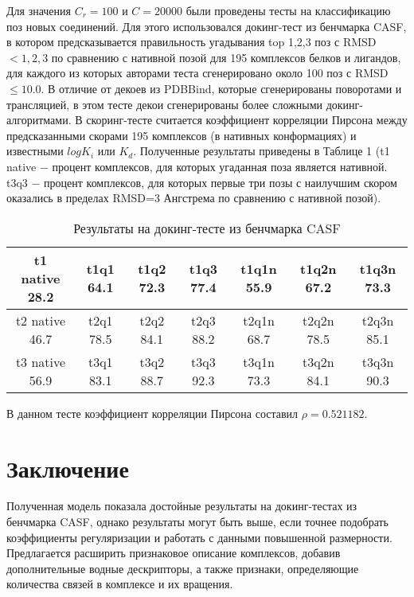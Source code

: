 \documentclass[preprint,12pt,3p]{elsarticle}
\begin{document}
Для значения $C_r = 100$ и $C = 20000$ были проведены тесты на классификацию поз новых соединений. Для этого использовался докинг-тест из бенчмарка CASF, в котором предсказывается правильность угадывания top 1,2,3 поз с RMSD $< 1,2,3$ по сравнению с нативной позой для 195 комплексов белков и лигандов, для каждого из которых авторами теста сгенерировано около 100 поз с RMSD $\leq 10.0$. В отличие от декоев из PDBBind, которые сгенерированы поворотами и трансляцией, в этом тесте декои сгенерированы более сложными докинг-алгоритмами. В скоринг-тесте считается коэффициент корреляции Пирсона между предсказанными скорами 195 комплексов (в нативных конформациях) и известными $log K_i$ или $K_d$. Полученные результаты приведены в Таблице 1 (t1 native $-$ процент комплексов, для которых угаданная поза является нативной. t3q3 $-$ процент комплексов, для которых первые три позы с наилучшим скором оказались в пределах RMSD=3 Ангстрема по сравнению с нативной позой).

\begin{table}[h]
 \begin{tabular}{||c || c || c || c || c || c || c||} 
 \hline
 t1 native 28.2	& t1q1 64.1	& t1q2 72.3	& t1q3 77.4 & t1q1n 55.9 & t1q2n 67.2	& t1q3n 73.3 \\
 \hline
 t2 native 46.7	& t2q1 78.5	& t2q2 84.1	& t2q3 88.2 & t2q1n 68.7 & t2q2n 78.5 & t2q3n 85.1 \\
 \hline
 t3 native 56.9 & t3q1 83.1 & t3q2 88.7	& t3q3 92.3 & t3q1n 73.3 & t3q2n 84.1 & t3q3n 90.3 \\
 \hline
\end{tabular}
\caption{\label{tab:table-name} Результаты на докинг-тесте из бенчмарка CASF}
\end{table}

В данном тесте коэффициент корреляции Пирсона составил $\rho=0.521182$.

\section{Заключение}
Полученная модель показала достойные результаты на докинг-тестах из бенчмарка CASF, однако результаты могут быть выше, если точнее подобрать коэффициенты регуляризации и работать с данными повышенной размерности. Предлагается расширить признаковое описание комплексов, добавив дополнительные водные дескрипторы, а также признаки, определяющие количества связей в комплексе и их вращения.

\end{document}
